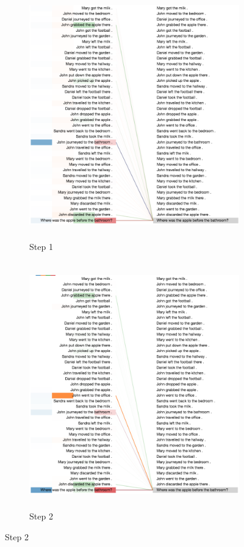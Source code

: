 \begin{figure}[h!]
\begin{minipage}{\textwidth}
    \centering
    \begin{subfigure}[t]{\textwidth}
        \centering
        \includegraphics[height=4.2in]{04-part-03/chapter-06/figs_and_tables/figs_attention_babi/e4-step1}
        \caption{Step 1}
    \end{subfigure}%
    \hfill \hfill
    \begin{subfigure}[t]{\textwidth}
        \centering
        \includegraphics[height=4.2in, trim={0 0 0 0.1cm},clip]{04-part-03/chapter-06/figs_and_tables/figs_attention_babi/e4-step2}
        \caption{Step 2}
    \end{subfigure}
\end{minipage}
\end{figure}
